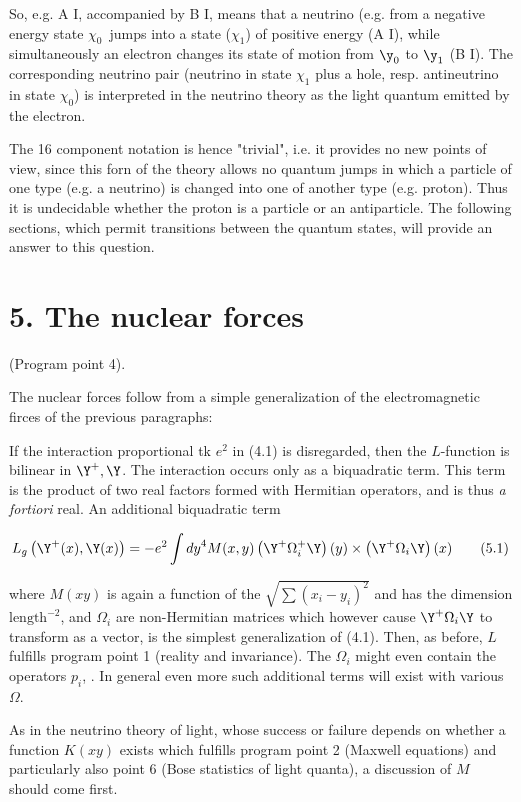 \documentclass{article}
\newcommand{\nequ}[2]{
\begin{align*}
#1
\tag{#2}
\end{align*}
}
\begin{document}
So, e.g. A I, accompanied by B I, means that a neutrino (e.g. from a negative energy state $\chi_0$\ jumps into a state ($\chi_1$) of positive energy (A I), while simultaneously an electron changes its state of motion from $\y_0$ to $\y_1$ (B I). The corresponding neutrino pair (neutrino in state $\chi_1$ plus a hole, resp. antineutrino in state $\chi_0$) is interpreted in the neutrino theory as the light quantum emitted by the electron.

The 16 component notation is hence "trivial", i.e. it provides no new points of view, since this forn of the theory allows no quantum jumps in which a particle of one type (e.g. a neutrino) is changed into one of another type (e.g. proton). Thus it is undecidable whether the proton is a particle or an antiparticle. The following sections, which permit transitions between the quantum states, will provide an answer to this question.

\section*{5. The nuclear forces} (Program point 4).

The nuclear forces follow from a simple generalization of the electromagnetic firces of the previous paragraphs:

If the interaction proportional tk $e^2$ in (4.1) is disregarded, then the $L$-function is bilinear in $\Y^+,\Y$. The interaction occurs only as a biquadratic term. This term is the product of two real factors formed with Hermitian operators, and is thus \textit{a fortiori} real. An additional biquadratic term
\nequ{
L_g\left(\Y^+(x), \Y(x) \right) = -e^2 \int{dy}^4 M(x,y)\left(\Y^+ \Omega_i^+ \Y \right)(y)
\times \left(\Y^+ \Omega_i \Y \right)(x)
}{5.1}
where $M(xy)$ is again a function of the  $\sqrt{\sum(x_i-y_i)^2}$ and has the dimension $\text{length}^{-2}$, and $\Omega_i$ are non-Hermitian matrices which however cause $\Y^+ \Omega_i \Y$ to transform as a vector, is the simplest generalization of (4.1). Then, as before, $L$ fulfills program point 1 (reality and invariance). The $\Omega_i$ might even contain the operators $p_i$, \cite{13}. In general even more such additional terms will exist with various $\Omega$.

As in the neutrino theory of light, whose success or failure depends on whether a function $K(xy)$ exists which fulfills program point 2 (Maxwell equations) and particularly also point 6 (Bose statistics of light quanta), a discussion of $M$ should come first.
\end{document}
